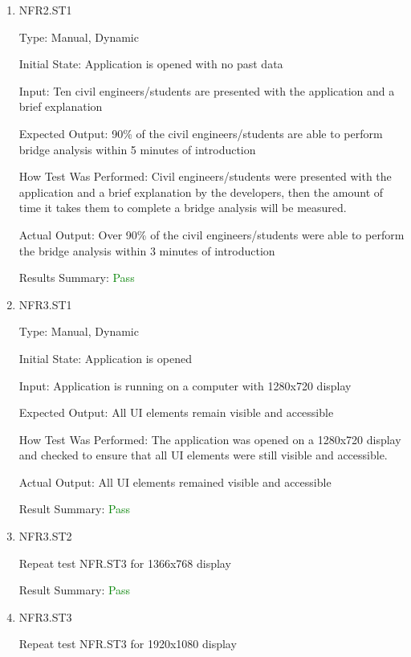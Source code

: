 \documentclass[12pt, titlepage]{article}
\begin{document}
\begin{enumerate}

\item{NFR2.ST1\\}

Type: Manual, Dynamic

Initial State: Application is opened with no past data

Input: Ten civil engineers/students are presented with the application and a brief explanation

Expected Output: 90\% of the civil engineers/students are able to perform bridge analysis within 5 minutes of introduction

How Test Was Performed: Civil engineers/students were presented with the application and a brief explanation by the developers, then the amount of time it takes them to complete a bridge analysis will be measured.

Actual Output: Over 90\% of the civil engineers/students were able to perform the bridge analysis within 3 minutes of introduction

Results Summary: \textcolor{green} {Pass}

\item{NFR3.ST1\\}

Type: Manual, Dynamic

Initial State: Application is opened

Input: Application is running on a computer with 1280x720 display

Expected Output: All UI elements remain visible and accessible

How Test Was Performed: The application was opened on a 1280x720 display and checked to ensure that all UI elements were still visible and accessible.

Actual Output: All UI elements remained visible and accessible

Result Summary: \textcolor{green} {Pass}

\item{NFR3.ST2\\}

Repeat test NFR.ST3 for 1366x768 display

Result Summary: \textcolor{green} {Pass}

\item{NFR3.ST3\\}

Repeat test NFR.ST3 for 1920x1080 display


\end{enumerate}
\end{document}
